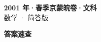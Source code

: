 \documentclass[zihao=-4, a4paper]{ctexart}
\begin{document}
\begin{center}
  {\Large\bfseries 2001 年·春季京蒙皖卷·文科}\\[4pt]
  {\large 数学 · 简答版}
\end{center}
\medskip
{}

\clearpage
{}
\begin{center}{\Large\bfseries 答案速查}\end{center}
\medskip

\end{document}
